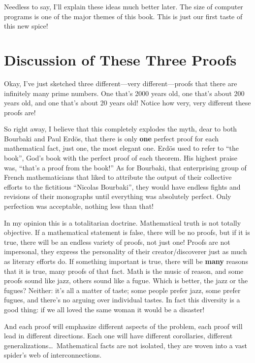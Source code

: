 \documentclass[12pt]{book}
\begin{document}
Needless to say, I'll explain these ideas much better later. The size of
computer programs is one of
the major themes of this book. This is just our first taste of this new spice!

\section*{Discussion of These Three Proofs}

Okay, I've just sketched three different---very different---proofs that there are infinitely
many prime numbers.  One that's 2000 years old, one that's about 200 years old, and one that's
about 20 years old! Notice how very, very different these proofs are!

So right away, I believe that this completely explodes the myth, dear to both Bourbaki
and Paul Erd\"os, that there is only \textbf{one} perfect proof for each mathematical fact, just
one, the most elegant one.
Erd\"os used to refer to ``the book'', God's book with the perfect proof of each theorem.
His highest praise was, ``that's a proof from the book!'' As for Bourbaki, that enterprising
group of French mathematicians that liked to attribute the output of their collective efforts
to the fictitious ``Nicolas Bourbaki'', they would have endless fights and revisions of their monographs
until everything was absolutely perfect.  Only perfection was acceptable, nothing less than that!

In my opinion this is a totalitarian doctrine. Mathematical truth is not totally objective.
If a mathematical statement is false, there will be no proofs, but if it is true, there will
be an endless variety of proofs, not just one!  Proofs are not impersonal, they express
the personality of their creator/discoverer just as much as literary efforts do.  If something
important is true, there will be \textbf{many} reasons that it is true, many proofs of that fact.
Math is the music of reason, and some proofs sound like jazz, others sound like a fugue.
Which is better, the jazz or the fugues? Neither: it's all a matter of taste; some people prefer
jazz, some prefer fugues, and there's no arguing over individual tastes.
In fact this diversity is a good thing: if we all loved the same woman it would be a disaster!

And each proof will emphasize different aspects of the problem, each proof will lead in different
directions.  
Each one will have different corollaries, different generalizations\ldots\
Mathematical facts are not isolated, they are woven into a vast spider's web of
interconnections.  
\end{document}
